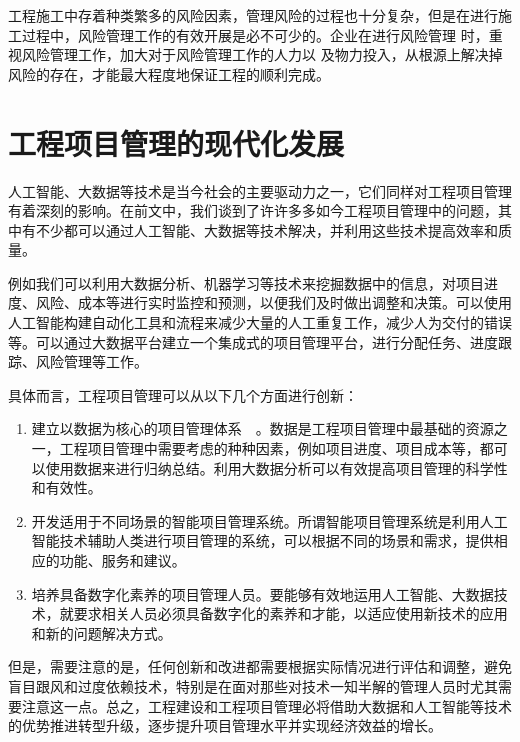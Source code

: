 	工程施工中存着种类繁多的风险因素，管理风险的过程也十分复杂，但是在进行施工过程中，风险管理工作的有效开展是必不可少的。企业在进行风险管理 时，重视风险管理工作，加大对于风险管理工作的人力以 及物力投入，从根源上解决掉风险的存在，才能最大程度地保证工程的顺利完成。
	
	\section{工程项目管理的现代化发展}
	
	人工智能、大数据等技术是当今社会的主要驱动力之一，它们同样对工程项目管理有着深刻的影响。在前文中，我们谈到了许许多多如今工程项目管理中的问题，其中有不少都可以通过人工智能、大数据等技术解决，并利用这些技术提高效率和质量。
	
	例如我们可以利用大数据分析、机器学习等技术来挖掘数据中的信息，对项目进度、风险、成本等进行实时监控和预测，以便我们及时做出调整和决策。可以使用人工智能构建自动化工具和流程来减少大量的人工重复工作，减少人为交付的错误等。可以通过大数据平台建立一个集成式的项目管理平台，进行分配任务、进度跟踪、风险管理等工作。
	
	具体而言，工程项目管理可以从以下几个方面进行创新：
	
	\begin{enumerate}
		\item 建立以数据为核心的项目管理体系~\cite{ChenSuFangShuJuKuJiShuZaiCeHuiGongChengXiangMuGuanLiZhongDeYingYong2022,HuZhenYuDaShuJuBeiJingXiaGongChengXiangMuGuanLiTanXi2022}~。数据是工程项目管理中最基础的资源之一，工程项目管理中需要考虑的种种因素，例如项目进度、项目成本等，都可以使用数据来进行归纳总结。利用大数据分析可以有效提高项目管理的科学性和有效性。
		\item 开发适用于不同场景的智能项目管理系统。所谓智能项目管理系统是利用人工智能技术辅助人类进行项目管理的系统，可以根据不同的场景和需求，提供相应的功能、服务和建议。
		\item 培养具备数字化素养的项目管理人员。要能够有效地运用人工智能、大数据技术，就要求相关人员必须具备数字化的素养和才能，以适应使用新技术的应用和新的问题解决方式。
	\end{enumerate}
	
	但是，需要注意的是，任何创新和改进都需要根据实际情况进行评估和调整，避免盲目跟风和过度依赖技术，特别是在面对那些对技术一知半解的管理人员时尤其需要注意这一点。总之，工程建设和工程项目管理必将借助大数据和人工智能等技术的优势推进转型升级，逐步提升项目管理水平并实现经济效益的增长。
	
	
	
	

